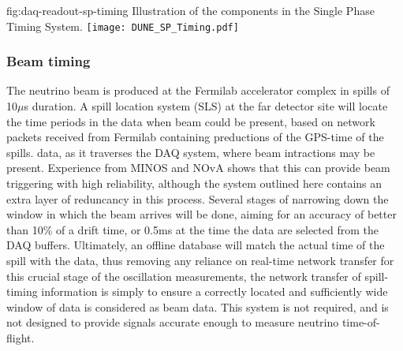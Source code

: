 \begin{dunefigure}{fig:daq-readout-sp-timing}
  {Illustration of the components in the Single Phase Timing System.}
  \texttt{[image: DUNE\_SP\_Timing.pdf]}
\end{dunefigure}

\subsubsection{Beam timing}
\label{sec:fdsp-daq-design-beamtiming}

The neutrino beam is produced at the Fermilab accelerator complex in
spills of 10$\mu$s duration.  A spill location system (SLS) at the far
detector site will locate the time periods in the data when beam could
be present, based on network packets received from Fermilab containing
preductions of the GPS-time of the spills. data, as it traverses the
DAQ system, where beam intractions may be present.  Experience from
MINOS and NOvA shows that this can provide beam triggering with high
reliability, although the system outlined here contains an extra layer
of reduncancy in this process.  Several stages of narrowing down the
window in which the beam arrives will be done, aiming for an accuracy
of better than 10\% of a drift time, or 0.5\/ms at the time the data
are selected from the DAQ buffers.  Ultimately, an offline database
will match the actual time of the spill with the data, thus removing
any reliance on real-time network transfer for this crucial stage of
the oscillation measurements, the network transfer of spill-timing
information is simply to ensure a correctly located and sufficiently
wide window of data is considered as beam data. This system is not
required, and is not designed to provide signals accurate enough to
measure neutrino time-of-flight.

